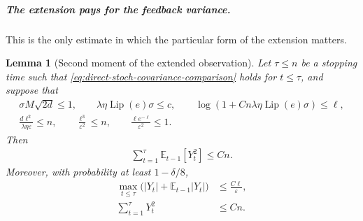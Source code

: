 \documentclass{article}
\theoremstyle{plain}
\newtheorem{lemma}[theorem]{Lemma}
\theoremstyle{definition}
\theoremstyle{plain}
\newcommand{\E}{\mathbb E}
\begin{document}
\subparagraph{The extension pays for the feedback variance.}
This is the only estimate in which the particular form of the
extension matters.

\begin{lemma}[Second moment of the extended observation]
    \label{lem:direct-stoch-feedback}
    Let $\tau\leq n$ be a stopping time such that
    \eqref{eq:direct-stoch-covariance-comparison} holds for
    $t\leq\tau$, and suppose that
    \begin{align}
        \sigma M\sqrt{2d}\leq1,
        \qquad
        \lambda\eta\operatorname{Lip}(e)\sigma\leq c,
        \qquad
        \log\left(
        1+Cn\lambda\eta\operatorname{Lip}(e)\sigma
        \right)\leq\ell,
        \label{eq:direct-stoch-feedback-trace-conditions}
        \\
        \frac{d\ell^2}{\lambda\eta\varepsilon}\leq n,
        \qquad
        \frac{\ell^3}{\varepsilon^2}\leq n,
        \qquad
        \frac{\ell e^{-\ell}}{\varepsilon^2}\leq1.
        \label{eq:direct-stoch-feedback-conditions}
    \end{align}
    Then
    \begin{align}
        \sum_{t=1}^{\tau}\E_{t-1}[Y_t^2]\leq Cn.
        \label{eq:direct-stoch-predictable-Y2}
    \end{align}
    Moreover, with probability at least $1-\delta/8$,
    \begin{align}
        \max_{t\leq\tau}
        \bigl(|Y_t|+\E_{t-1}|Y_t|\bigr)
                               & \leq\frac{C\ell}{\varepsilon},
        \label{eq:direct-stoch-Ymax}
        \\
        \sum_{t=1}^{\tau}Y_t^2 & \leq Cn.
        \label{eq:direct-stoch-Y2}
    \end{align}
\end{lemma}
\end{document}
